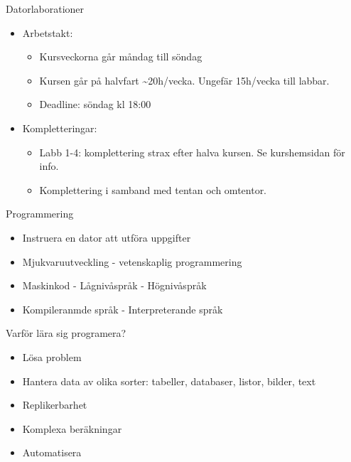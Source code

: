 \documentclass[
  10pt,
  ignorenonframetext,
]{beamer}
\providecommand{\tightlist}{%
  \setlength{\itemsep}{0pt}\setlength{\parskip}{0pt}}
\begin{document}

\begin{frame}{Datorlaborationer}
\protect\hypertarget{datorlaborationer-1}{}
\begin{itemize}
\tightlist
\item
  Arbetstakt:

  \begin{itemize}
  \tightlist
  \item
    Kursveckorna går måndag till söndag
  \item
    Kursen går på halvfart \textasciitilde20h/vecka. Ungefär 15h/vecka
    till labbar.
  \item
    Deadline: söndag kl 18:00
  \end{itemize}
\item
  Kompletteringar:

  \begin{itemize}
  \tightlist
  \item
    Labb 1-4: komplettering strax efter halva kursen. Se kurshemsidan
    för info.
  \item
    Komplettering i samband med tentan och omtentor.
  \end{itemize}
\end{itemize}
\end{frame}


\begin{frame}{Programmering}
\protect\hypertarget{programmering}{}
\begin{itemize}[<+->]
\tightlist
\item
  Instruera en dator att utföra uppgifter
\item
  Mjukvaruutveckling - vetenskaplig programmering
\item
  Maskinkod - Lågnivåspråk - Högnivåspråk
\item
  Kompileranmde språk - Interpreterande språk
\end{itemize}
\end{frame}


\begin{frame}{Varför lära sig programera?}
\protect\hypertarget{varfuxf6r-luxe4ra-sig-programera}{}
\begin{itemize}[<+->]
\tightlist
\item
  Lösa problem
\item
  Hantera data av olika sorter: tabeller, databaser, listor, bilder, text
\item
  Replikerbarhet
\item
  Komplexa beräkningar
\item
  Automatisera
\end{itemize}
\end{frame}
\end{document}

